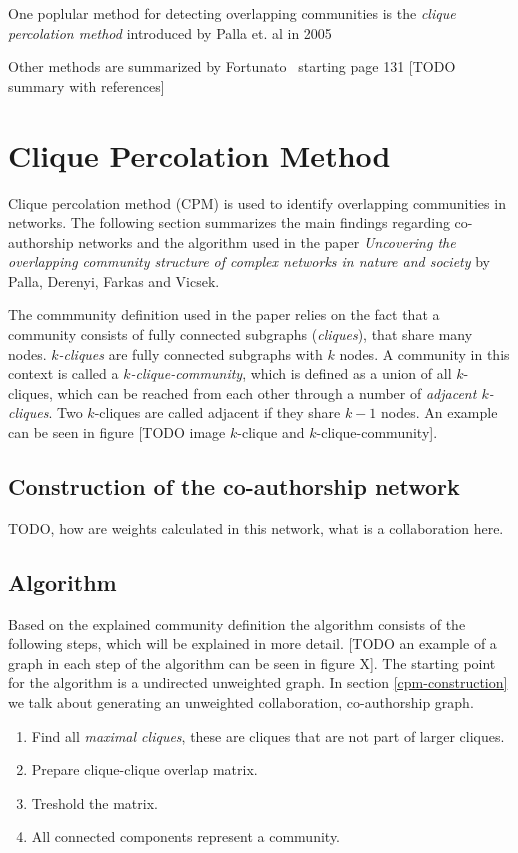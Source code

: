 \documentclass[runningheads,a4paper]{llncs}
\begin{document}
One poplular method for detecting overlapping communities is the \emph{clique percolation method} introduced by Palla et. al in 2005~\cite{palla2005uncovering}

Other methods are summarized by Fortunato~\cite{fortunato2010community} starting page 131 [TODO summary with references]

\section{Clique Percolation Method}
\label{cpm}
Clique percolation method (CPM) is used to identify overlapping communities in networks. The following section summarizes the main findings regarding co-authorship networks and the algorithm used in the paper \emph{Uncovering the overlapping community structure of complex networks in nature and society} by Palla, Derenyi, Farkas and Vicsek.

The commmunity definition used in the paper relies on the fact that a community consists of fully connected subgraphs (\emph{cliques}), that share many nodes. \emph{$k$-cliques} are fully connected subgraphs with $k$ nodes. A community in this context is called a \emph{$k$-clique-community}, which is defined as a union of all $k$-cliques, which can be reached from each other through a number of \emph{adjacent $k$-cliques}. Two $k$-cliques are called adjacent if they share $k-1$ nodes. An example can be seen in figure [TODO image $k$-clique and $k$-clique-community].

\subsection{Construction of the co-authorship network}
TODO, how are weights calculated in this network, what is a collaboration here.

\subsection{Algorithm}
Based on the explained community definition the algorithm consists of the following steps, which will be explained in more detail. [TODO an example of a graph in each step of the algorithm can be seen in figure X]. The starting point for the algorithm is a undirected unweighted graph. In section \ref{cpm-construction} we talk about generating an unweighted collaboration, co-authorship graph.

\begin{enumerate}
\item Find all \emph{maximal cliques}, these are cliques that are not part of larger cliques.
\item Prepare clique-clique overlap matrix.
\item Treshold the matrix.
\item All connected components represent a community.
\end{enumerate}
\end{document}
